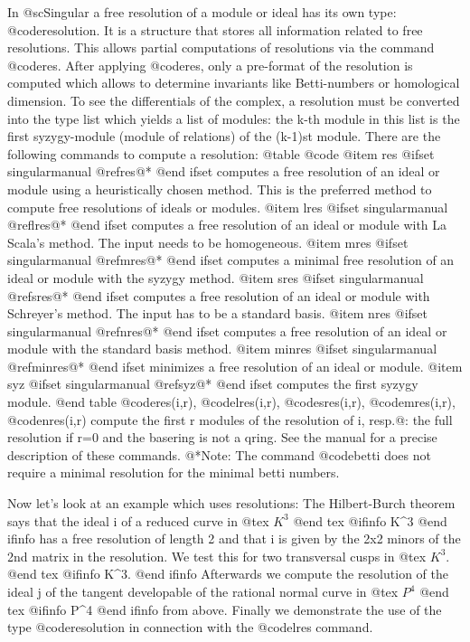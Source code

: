 In @sc{Singular} a free resolution of a module or ideal has its own type:
@code{resolution}. It is a structure that stores all information related to
free resolutions. This allows partial computations of resolutions via
the command @code{res}. After applying @code{res}, only a pre-format of the
resolution is computed which allows to determine invariants like
Betti-numbers or homological dimension. To see the differentials
of the complex, a resolution must be converted into the type list which
yields a list of modules: the k-th module in this
list is the first syzygy-module (module of relations) of the (k-1)st module.
There are the following commands to compute a resolution:
@table @code
@item res
@ifset singularmanual
@ref{res}@*
@end ifset
computes a free resolution of an ideal or module using a heuristically
chosen method.
This is the preferred method to compute free resolutions of ideals or
modules.
@item lres
@ifset singularmanual
@ref{lres}@*
@end ifset
computes a free resolution of an ideal or module with La Scala's
method. The input needs to be homogeneous.
@item mres
@ifset singularmanual
@ref{mres}@*
@end ifset
computes a minimal free resolution of an ideal or module with the syzygy
method.
@item sres
@ifset singularmanual
@ref{sres}@*
@end ifset
computes a free resolution of an ideal or module with Schreyer's
method. The input has to be a standard basis.
@item nres
@ifset singularmanual
@ref{nres}@*
@end ifset
computes a free resolution of an ideal or module with the standard basis
method.
@item minres
@ifset singularmanual
@ref{minres}@*
@end ifset
minimizes a free resolution of an ideal or module.
@item syz
@ifset singularmanual
@ref{syz}@*
@end ifset
computes the first syzygy module.
@end table
@code{res(i,r)}, @code{lres(i,r)}, @code{sres(i,r)}, @code{mres(i,r)},
@code{nres(i,r)} compute the first r modules of the resolution
of i, resp.@: the full resolution if r=0 and the basering is not a qring.
See the manual for a precise description of these commands.
@*Note: The command @code{betti} does not require a minimal
resolution for the minimal betti numbers.

Now let's look at an example which uses resolutions: The Hilbert-Burch
theorem says that the ideal i of a reduced curve in
@tex
$K^3$
@end tex
@ifinfo
K^3
@end ifinfo
has a free resolution of length 2 and that i is given by the 2x2 minors
of the 2nd matrix in the resolution.
We test this for two transversal cusps in
@tex
$K^3$.
@end tex
@ifinfo
K^3.
@end ifinfo
Afterwards we compute the resolution of the ideal j of the tangent developable
of the rational normal curve in
@tex
$P^4$
@end tex
@ifinfo
P^4
@end ifinfo
from above.
Finally we demonstrate the use of the type @code{resolution} in connection with
the @code{lres} command.

